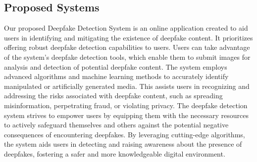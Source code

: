 \subsection{Proposed Systems}
Our proposed Deepfake Detection System is an online application created to aid users in identifying and mitigating the existence of deepfake content. It prioritizes offering robust deepfake detection capabilities to users. Users can take advantage of the system's deepfake detection tools, which enable them to submit images for analysis and detection of potential deepfake content. The system employs advanced algorithms and machine learning methods to accurately identify manipulated or artificially generated media. This assists users in recognizing and addressing the risks associated with deepfake content, such as spreading misinformation, perpetrating fraud, or violating privacy. The deepfake detection system strives to empower users by equipping them with the necessary resources to actively safeguard themselves and others against the potential negative consequences of encountering deepfakes. By leveraging cutting-edge algorithms, the system aids users in detecting and raising awareness about the presence of deepfakes, fostering a safer and more knowledgeable digital environment.
